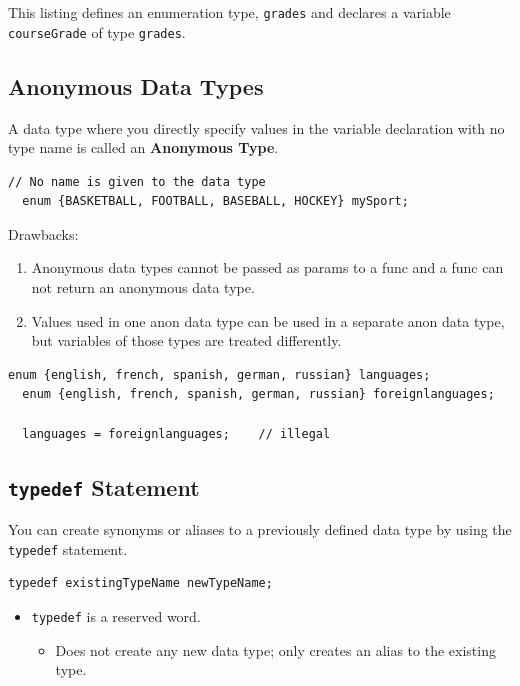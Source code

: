 \documentclass{article}
\begin{document}
This listing defines an enumeration type, \texttt{grades} and declares a
variable \texttt{courseGrade} of type \texttt{grades}.

\subsection{Anonymous Data Types}
A data type where you directly specify values in the variable declaration with
no type name is called an \textbf{Anonymous Type}.
\begin{lstlisting}[caption={Anonymous Enumeration Type Example}]
  // No name is given to the data type
  enum {BASKETBALL, FOOTBALL, BASEBALL, HOCKEY} mySport;
\end{lstlisting}

Drawbacks:
\begin{enumerate}
  \item Anonymous data types cannot be passed as params to a func and a func can
    not return an anonymous data type.
  \item Values used in one anon data type can be used in a separate anon data
    type, but variables of those types are treated differently.
\end{enumerate}

\begin{lstlisting}[caption={illegal \texttt{enum} operations}]
  enum {english, french, spanish, german, russian} languages;
  enum {english, french, spanish, german, russian} foreignlanguages;

  languages = foreignlanguages;    // illegal
\end{lstlisting}

\subsection{\texttt{typedef} Statement}
You can create synonyms or aliases to a previously defined data type by using
the \texttt{typedef} statement.

\begin{lstlisting}[caption={\texttt{typedef} Statement Syntax}]
  typedef existingTypeName newTypeName;
\end{lstlisting}

\begin{itemize}
  \item \texttt{typedef} is a reserved word.
    \begin{itemize}
      \item Does not create any new data type; only creates an alias to the
        existing type.
    \end{itemize}
\end{itemize}
\end{document}

